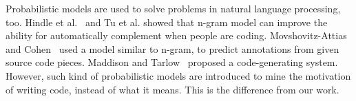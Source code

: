 Probabilistic models are used to solve problems in natural language processing, too. Hindle et al.~ and Tu et al.\cite{tu2014localness}
showed that n-gram model can improve the ability for automatically
complement when people are coding.
Movshovitz-Attias and Cohen~ used a model similar to n-gram,
to predict annotations from given source code pieces.
Maddison and Tarlow~ proposed a code-generating system.
However, such kind of probabilistic models are introduced to mine the motivation of
writing code, instead of what it means. This is the difference from our work.

%
